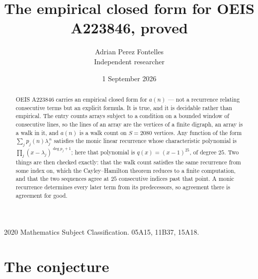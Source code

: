 \documentclass[11pt,a4paper]{article}
\title{The empirical closed form for OEIS A223846, proved}
\author{Adrian Perez Fontelles\\ \small Independent researcher}
\date{1 September 2026}
\theoremstyle{plain}
\theoremstyle{definition}
\begin{document}
\maketitle

\begin{abstract}
OEIS A223846 carries an empirical closed form for $a(n)$ --- not a recurrence relating
consecutive terms but an explicit formula. It is true, and it is decidable rather than
empirical. The entry counts arrays subject to a condition on a bounded window of consecutive lines, so the lines of an array are the
vertices of a finite digraph, an array is a walk in it, and $a(n)$ is a walk count on
$S=2080$ vertices. Any function of the form $\sum_j p_j(n)\lambda_j^{\,n}$ satisfies the
monic linear recurrence whose characteristic polynomial is
$\prod_j(x-\lambda_j)^{\deg p_j+1}$; here that polynomial is $q(x)=(x-1)^{25}$, of degree
$25$. Two things are then checked exactly: that the walk count satisfies the same
recurrence from some index on, which the Cayley--Hamilton theorem reduces to a finite
computation, and that the two sequences agree at $25$ consecutive indices past that
point. A monic recurrence determines every later term from its predecessors, so agreement
there is agreement for good.
\end{abstract}

\noindent\small 2020 Mathematics Subject Classification. 05A15, 11B37, 15A18.\normalsize

\section{The conjecture}
\end{document}
